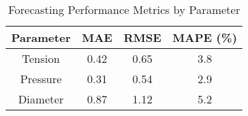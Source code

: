 \begin{table}[h]
\caption{Forecasting Performance Metrics by Parameter}
\label{table:forecasting}
\begin{center}
\begin{tabular}{|c|c|c|c|}
\hline
\textbf{Parameter} & \textbf{MAE} & \textbf{RMSE} & \textbf{MAPE (\%)} \\
\hline
Tension & 0.42 & 0.65 & 3.8 \\
\hline
Pressure & 0.31 & 0.54 & 2.9 \\
\hline
Diameter & 0.87 & 1.12 & 5.2 \\
\hline
\end{tabular}
\end{center}
\end{table}